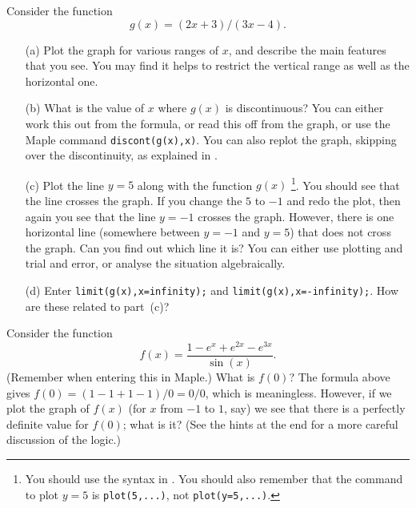 \documentclass[a4paper,10pt]{amsbook}
\numberwithin{example}{chapter}
\begin{document}
\begin{exercise}\label{ex-mobius}
 Consider the function
 \[ g(x) = (2x+3)/(3x-4). \]
 \begin{itemize}
  \item[(a)]
   Plot the graph for various ranges of $x$, and describe the main
   features that you see.  You may find it helps to restrict the
   vertical range \note{\NOTEvertrange} as well as the horizontal one.
  \item[(b)] What is the value of $x$ where $g(x)$ is discontinuous? 
   You can either work this out from the formula, or read this off
   from the graph, or use the Maple command \verb~discont(g(x),x)~. 
   You can also replot the graph, skipping over the
   discontinuity, as explained in \note{\NOTEdiscont}.
  \item[(c)] 
   Plot the line $y=5$ along with the function $g(x)$  
   \footnote{You should use the syntax in \note{\NOTEtwoplots}.  You
   should also remember that the command to plot $y=5$ is
   \verb~plot(5,...)~, not \verb~plot(y=5,...)~.}. 
   You should see that the line crosses the graph.  If you change the
   $5$ to $-1$ and redo the plot, then again you see that the line
   $y=-1$ crosses the graph.  However, there is one horizontal line
   (somewhere between $y=-1$ and $y=5$) that does not cross the
   graph.  Can you find out which line it is?  You can either use
   plotting and trial and error, or analyse the situation
   algebraically. 
  \item[(d)] Enter \verb~limit(g(x),x=infinity);~ and
   \verb~limit(g(x),x=-infinity);~.  How are these related to
   part~(c)? 
 \end{itemize}
\end{exercise}
        
\begin{exercise}\label{ex-lhopital}
 Consider the function
 \[ f(x) = \frac{1 - e^x + e^{2x} - e^{3x}}{\sin(x)}. \]
 (Remember \note{\NOTEarrow} when entering this in Maple.)
 What is $f(0)$?  The formula above gives $f(0)=(1-1+1-1)/0=0/0$,
 which is meaningless.  However, if we plot the graph of $f(x)$ (for
 $x$ from $-1$ to $1$, say) we see that there is a perfectly definite
 value for $f(0)$; what is it?  
(See the hints at the end for a more careful discussion of the logic.) 
\end{exercise}
\end{document}
